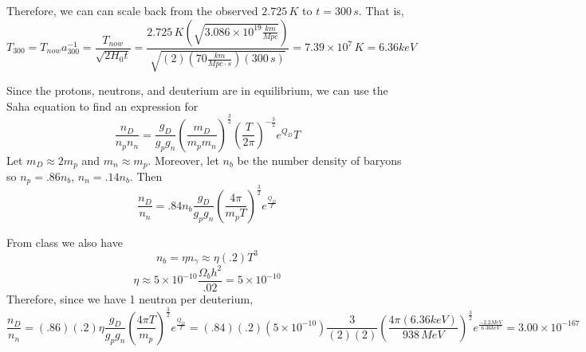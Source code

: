 \documentclass{article}
\begin{document}
Therefore, we can can scale back from the observed $2.725\,K$ to $t=300\,s$. That is,
\[T_{300} = T_{now}a_{300}^{-1}=\frac{T_{now}}{\sqrt{2H_0 t}} = \frac{2.725\,K(\sqrt{3.086\times 10^{19}\frac{km}{Mpc}})}{\sqrt{(2)(70\frac{km}{Mpc\cdot s})(300\,s)}} = 7.39\times 10^7\,K=6.36keV\]

Since the protons, neutrons, and deuterium are in equilibrium, we can use the Saha equation to find an expression for
\[\frac{n_D}{n_pn_n} = \frac{g_D}{g_pg_n}\left(\frac{m_D}{m_pm_n}\right)^{\frac{3}{2}}\left(\frac{T}{2\pi}\right)^{-\frac{3}{2}}e^{Q_D}{T}\]
Let $m_D\approx 2m_p$ and $m_n\approx m_p$. Moreover, let $n_b$ be the number density of baryons so $n_p = .86n_b$, $n_n=.14n_b$. Then
\[\frac{n_D}{n_n} = .84n_b\frac{g_D}{g_pg_n}\left(\frac{4\pi}{m_p T}\right)^{\frac{3}{2}}e^{\frac{Q_D}{T}}\]

From class we also have
\[n_b = \eta n_\gamma \approx \eta (.2)T^3\]
\[\eta \approx 5\times 10^{-10}\frac{\Omega_b h^2}{.02} = 5\times 10^{-10}\]
Therefore, since we have 1 neutron per deuterium,
\[\frac{n_D}{n_n} = (.86)(.2)\eta \frac{g_D}{g_pg_n}\left(\frac{4\pi T}{m_p}\right)^{\frac{3}{2}}e^{\frac{Q_D}{T}} = (.84)(.2)(5\times 10^{-10})\frac{3}{(2)(2)}\left(\frac{4\pi (6.36keV)}{938\,MeV}\right)^{\frac{3}{2}}e^{\frac{-2.2MeV}{6.36keV}}=3.00\times 10^{-167}\]
\end{document}
